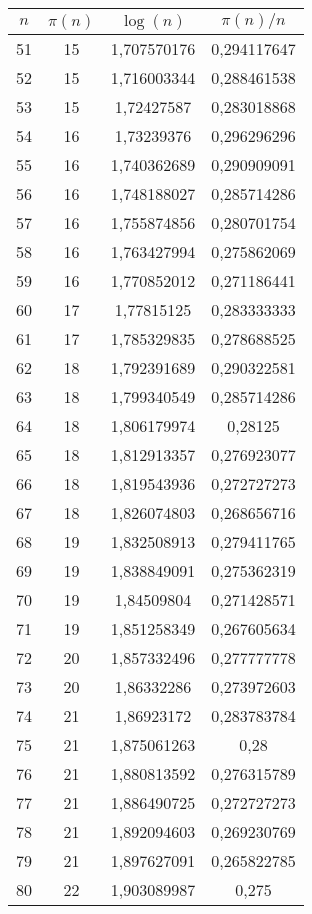 {\begin{minipage}[!h]{0.45\textwidth}
\begin{longtable}{cccc}
\(n\) & \(\pi(n)\) & \(\log(n)\) & \(\pi(n)/n\) \\ \hline
51 & 15 & 1,707570176 & 0,294117647 \\ \hline
52 & 15 & 1,716003344 & 0,288461538 \\ \hline
53 & 15 & 1,72427587 & 0,283018868 \\ \hline
54 & 16 & 1,73239376 & 0,296296296 \\ \hline
55 & 16 & 1,740362689 & 0,290909091 \\ \hline
56 & 16 & 1,748188027 & 0,285714286 \\ \hline
57 & 16 & 1,755874856 & 0,280701754 \\ \hline
58 & 16 & 1,763427994 & 0,275862069 \\ \hline
59 & 16 & 1,770852012 & 0,271186441 \\ \hline
60 & 17 & 1,77815125 & 0,283333333 \\ \hline
61 & 17 & 1,785329835 & 0,278688525 \\ \hline
62 & 18 & 1,792391689 & 0,290322581 \\ \hline
63 & 18 & 1,799340549 & 0,285714286 \\ \hline
64 & 18 & 1,806179974 & 0,28125 \\ \hline
65 & 18 & 1,812913357 & 0,276923077 \\ \hline
66 & 18 & 1,819543936 & 0,272727273 \\ \hline
67 & 18 & 1,826074803 & 0,268656716 \\ \hline
68 & 19 & 1,832508913 & 0,279411765 \\ \hline
69 & 19 & 1,838849091 & 0,275362319 \\ \hline
70 & 19 & 1,84509804 & 0,271428571 \\ \hline
71 & 19 & 1,851258349 & 0,267605634 \\ \hline
72 & 20 & 1,857332496 & 0,277777778 \\ \hline
73 & 20 & 1,86332286 & 0,273972603 \\ \hline
74 & 21 & 1,86923172 & 0,283783784 \\ \hline
75 & 21 & 1,875061263 & 0,28 \\ \hline
76 & 21 & 1,880813592 & 0,276315789 \\ \hline
77 & 21 & 1,886490725 & 0,272727273 \\ \hline
78 & 21 & 1,892094603 & 0,269230769 \\ \hline
79 & 21 & 1,897627091 & 0,265822785 \\ \hline
80 & 22 & 1,903089987 & 0,275 \\ \hline

\end{longtable}
\end{minipage}}
